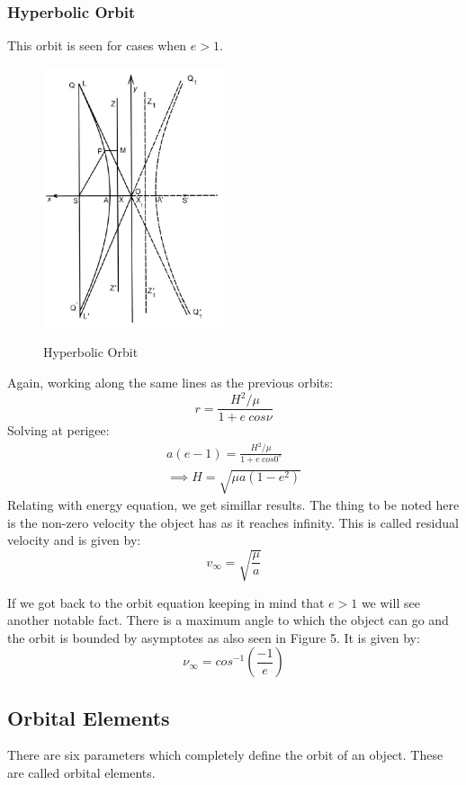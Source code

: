 \documentclass[12pt, letterpaper]{article}
\begin{document}
\subsubsection{Hyperbolic Orbit}
This orbit is seen for cases when $e>1$. 
\begin{figure}[ht]
	\centering
    \includegraphics[width = 200px]{hyperbola}
    \label{fig:hyperbola}
    \caption{Hyperbolic Orbit}
\end{figure}

Again, working along the same lines as the previous orbits:
\[ r = \frac{H^2/\mu}{1+e\:cos\nu} \]
Solving at perigee:
\begin{gather*}
	a(e-1) = \frac{H^2/\mu}{1+e\:cos0^\circ}\\
	\implies H = \sqrt{\mu a(1-e^2)}
\end{gather*}
Relating with energy equation, we get simillar results. The thing to be noted here is the non-zero velocity the object has as  it reaches infinity. This is called residual velocity and is given by:
\[ 
	v_\infty = \sqrt{\frac{\mu}{a}}
\]

If we got back to the orbit equation keeping in mind that $e>1$ we will see another notable fact. There is a maximum angle to which the object can go and the orbit is bounded by asymptotes as also seen in Figure 5. It is given by:
\[
	\nu_\infty = cos^{-1}\left( \frac{-1}{e} \right)
\]

\subsection{Orbital Elements}
There are six parameters which completely define the orbit of an object. These are called orbital elements.
\end{document}
